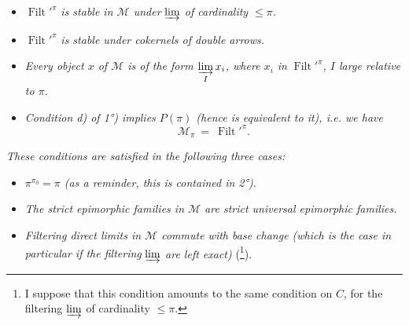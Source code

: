 \documentclass[11pt]{article}
\newcommand{\printedpage}[1]{\marginpar{\footnotesize p.~#1}}
\newcommand{\msp}[1]{\marginpar{\footnotesize [#1]}}
\newcommand{\Filt}{\operatorname{Filt}}
\begin{document}
\setcounter{footnote}{49}

\printedpage{39}

\begin{itemize}
\item[\textit{1)}] $\Filt'^{\pi}$ \textit{is stable in $\mathcal{M}$ under} $\varinjlim$ \textit{of cardinality $\leqslant \pi$.}
\item[\textit{1$'$)}] $\Filt'^{\pi}$ \textit{is stable under cokernels of double arrows.}
\item[\textit{2)}] \textit{Every object $x$ of $\mathcal{M}$ is of the form $\varinjlim\limits_{I} x_i$, where $x_i$ in} $\Filt'^{\pi}$\textit{, $I$ large relative to $\pi$.}
\item[\textit{3)}] \textit{Condition d) of 1°) implies $P(\pi)$ (hence is equivalent to it), i.e. we have}
\[ \mathcal{M}_{\pi} \ = \ \Filt'^{\pi}. \]
\end{itemize}

\msp{page 127}
\textit{These conditions are satisfied in the following three cases:}
\begin{itemize}
\item[\textit{A)}] \textit{$\pi^{\pi_0} = \pi$ (as a reminder, this is contained in 2°).}
\item[\textit{B)}] \textit{The strict epimorphic families in $\mathcal{M}$ are strict universal epimorphic families.}
\item[\textit{C)}] \textit{Filtering direct limits in $\mathcal{M}$ commute with base change (which is the case in particular if the filtering} $\varinjlim$ \textit{are left exact)} (\footnote{I suppose that this condition amounts to the same condition on $C$, for the filtering $\varinjlim$ of cardinality $\leqslant \pi$.}).
\end{itemize}
\end{document}

